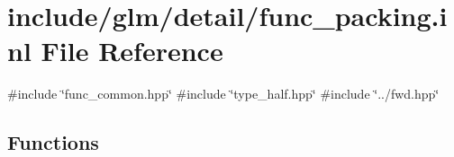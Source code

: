 \hypertarget{func__packing_8inl}{}\section{include/glm/detail/func\+\_\+packing.inl File Reference}
\label{func__packing_8inl}
{\ttfamily \#include \char`\"{}func\+\_\+common.\+hpp\char`\"{}}\newline
{\ttfamily \#include \char`\"{}type\+\_\+half.\+hpp\char`\"{}}\newline
{\ttfamily \#include \char`\"{}../fwd.\+hpp\char`\"{}}\newline
\subsection*{Functions}
